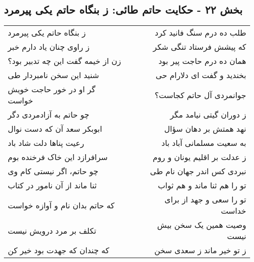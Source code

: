 \begin{center}
\section*{بخش ۲۲ - حکایت حاتم طائی: ز بنگاه حاتم یکی پیرمرد}
\label{sec:022}
\begin{longtable}{l p{0.5cm} r}
ز بنگاه حاتم یکی پیرمرد
&&
طلب ده درم سنگ فانید کرد
\\
ز راوی چنان یاد دارم خبر
&&
که پیشش فرستاد تنگی شکر
\\
زن از خیمه گفت این چه تدبیر بود؟
&&
همان ده درم حاجت پیر بود
\\
شنید این سخن نامبردار طی
&&
بخندید و گفت ای دلارام حی
\\
گر او در خور حاجت خویش خواست
&&
جوانمردی آل حاتم کجاست؟
\\
چو حاتم به آزادمردی دگر
&&
ز دوران گیتی نیامد مگر
\\
ابوبکر سعد آن که دست نوال
&&
نهد همتش بر دهان سؤال
\\
رعیت پناها دلت شاد باد
&&
به سعیت مسلمانی آباد باد
\\
سرافرازد این خاک فرخنده بوم
&&
ز عدلت بر اقلیم یونان و روم
\\
چو حاتم، اگر نیستی کام وی
&&
نبردی کس اندر جهان نام طی
\\
ثنا ماند از آن نامور در کتاب
&&
تو را هم ثنا ماند و هم ثواب
\\
که حاتم بدان نام و آوازه خواست
&&
تو را سعی و جهد از برای خداست
\\
تکلف بر مرد درویش نیست
&&
وصیت همین یک سخن بیش نیست
\\
که چندان که جهدت بود خیر کن
&&
ز تو خیر ماند ز سعدی سخن
\\
\end{longtable}
\end{center}

